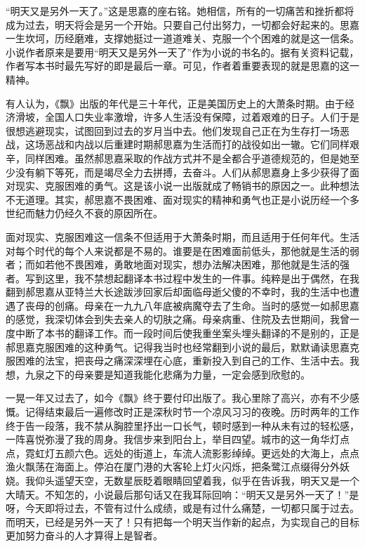 \par “明天又是另外一天了。”这是思嘉的座右铭。她相信，所有的一切痛苦和挫折都将成为过去，明天将会是另一个开始。只要自己付出努力，一切都会好起来的。思嘉一生坎坷，历经磨难，支撑她挺过一道道难关、克服一个个困难的就是这一信条。小说作者原来是要用“明天又是另外一天了”作为小说的书名的。据有关资料记载，作者写本书时最先写好的即是最后一章。可见，作者着重要表现的就是思嘉的这一精神。
\par 有人认为，《飘》出版的年代是三十年代，正是美国历史上的大萧条时期。由于经济滑坡，全国人口失业率激增，许多人生活没有保障，过着艰难的日子。人们于是很想逃避现实，试图回到过去的岁月当中去。他们发现自己正在为生存打一场恶战，这场恶战和内战以后重建时期郝思嘉为生活而打的战役如出一辙。它们同样艰辛，同样困难。虽然郝思嘉采取的作战方式并不是全都合乎道德规范的，但是她至少没有躺下等死，而是竭尽全力去拼搏，去奋斗。人们从郝思嘉身上多少获得了面对现实、克服困难的勇气。这是该小说一出版就成了畅销书的原因之一。此种想法不无道理。其实，郝思嘉不畏困难、面对现实的精神和勇气也正是小说历经一个多世纪而魅力仍经久不衰的原因所在。
\par 面对现实、克服困难这一信条不但适用于大萧条时期，而且适用于任何年代。生活对每个时代的每个人来说都是不易的。谁要是在困难面前低头，那他就是生活的弱者；而如若他不畏困难，勇敢地面对现实，想办法解决困难，那他就是生活的强者。写到这里，我不禁想起翻译本书过程中发生的一件事。纯粹是出于偶然，在我翻到郝思嘉从亚特兰大长途跋涉回家后却面临母逝父傻的不幸时，我的生活中也遭遇了丧母的创痛。母亲在一九九八年底被病魔夺去了生命。当时的感觉一如郝思嘉的感觉，我深切体会到失去亲人的切肤之痛。母亲病重、住院及去世期间，我曾一度中断了本书的翻译工作。而一段时间后使我重坐案头埋头翻译的不是别的，正是郝思嘉克服困难的这种勇气。记得我当时也经常翻到小说的最后，默默诵读思嘉克服困难的法宝，把丧母之痛深深埋在心底，重新投入到自己的工作、生活中去。我想，九泉之下的母亲要是知道我能化悲痛为力量，一定会感到欣慰的。
\par 一晃一年又过去了，如今《飘》终于要付印出版了。我心里除了高兴，亦有不少感慨。记得结束最后一遍修改时正是深秋时节一个凉风习习的夜晚。历时两年的工作终于告一段落，我不禁从胸腔里抒出一口长气，顿时感到一种从未有过的轻松感，一阵喜悦弥漫了我的周身。我信步来到阳台上，举目四望。城市的这一角华灯点点，霓虹灯五颜六色。远处的街道上，车流人流影影绰绰。更远处的大海上，点点渔火飘荡在海面上。停泊在厦门港的大客轮上灯火闪烁，把条鹭江点缀得分外妖娆。我仰头遥望天空，无数星辰眨着眼睛回望着我，似乎在告诉我，明天又是一个大晴天。不知怎的，小说最后那句话又在我耳际回响：“明天又是另外一天了！”是呀，今天即将过去，不管有过什么成绩，或是有过什么痛楚，一切都只属于过去。而明天，已经是另外一天了！只有把每一个明天当作新的起点，为实现自己的目标更加努力奋斗的人才算得上是智者。
\par {}
\par {}


